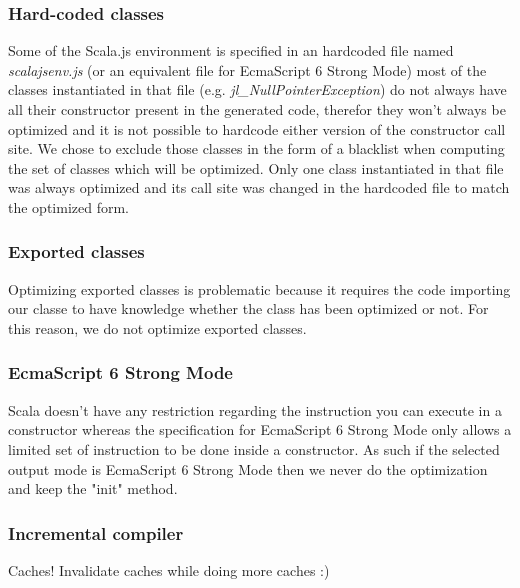 \subsubsection{Hard-coded classes}
Some of the Scala.js environment is specified in an hardcoded file named
\emph{scalajsenv.js} (or an equivalent file for EcmaScript 6 Strong Mode) most
of the classes instantiated in that file (e.g. \emph{jl\_NullPointerException})
do not always have all their constructor present in the generated code,
therefor they won't always be optimized and it is not possible to hardcode
either version of the constructor call site. We chose to exclude those classes
in the form of a blacklist when computing the set of classes which will be
optimized. Only one class instantiated in that file was always optimized and
its call site was changed in the hardcoded file to match the optimized form.
\subsubsection{Exported classes}
Optimizing exported classes is problematic because it requires the code
importing our classe to have knowledge whether the class has been optimized or
not. For this reason, we do not optimize exported classes.
\subsubsection{EcmaScript 6 Strong Mode}
Scala doesn't have any restriction regarding the instruction you can execute in
a constructor whereas the specification for EcmaScript 6 Strong Mode only
allows a limited set of instruction to be done inside a constructor. As such if
the selected output mode is EcmaScript 6 Strong Mode then we never do the
optimization and keep the "init" method.
\subsubsection{Incremental compiler}
Caches! Invalidate caches while doing more caches :)

